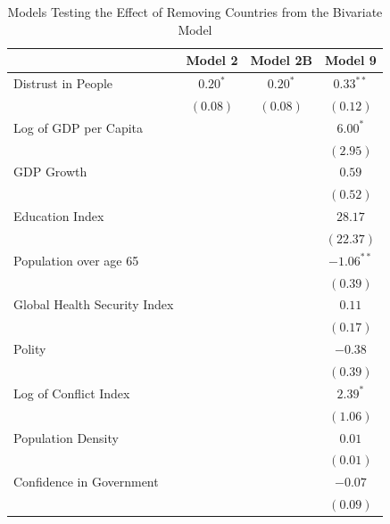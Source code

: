 \documentclass[
  12pt,
]{article}
\begin{document}
\begin{table}
\caption{Models Testing the Effect of Removing Countries from the Bivariate Model}
\begin{center}
\begin{small}
\begin{tabular}{l c c c}
\hline
 & Model 2 & Model 2B & Model 9 \\
\hline
Distrust in People           & $0.20^{*}$ & $0.20^{*}$ & $0.33^{**}$  \\
                             & $(0.08)$   & $(0.08)$   & $(0.12)$     \\
Log of GDP per Capita        &            &            & $6.00^{*}$   \\
                             &            &            & $(2.95)$     \\
GDP Growth                   &            &            & $0.59$       \\
                             &            &            & $(0.52)$     \\
Education Index              &            &            & $28.17$      \\
                             &            &            & $(22.37)$    \\
Population over age 65       &            &            & $-1.06^{**}$ \\
                             &            &            & $(0.39)$     \\
Global Health Security Index &            &            & $0.11$       \\
                             &            &            & $(0.17)$     \\
Polity                       &            &            & $-0.38$      \\
                             &            &            & $(0.39)$     \\
Log of Conflict Index        &            &            & $2.39^{*}$   \\
                             &            &            & $(1.06)$     \\
Population Density           &            &            & $0.01$       \\
                             &            &            & $(0.01)$     \\
Confidence in Government     &            &            & $-0.07$      \\
                             &            &            & $(0.09)$     \\

\end{tabular}
\end{small}
\end{center}
\end{table}
\end{document}
